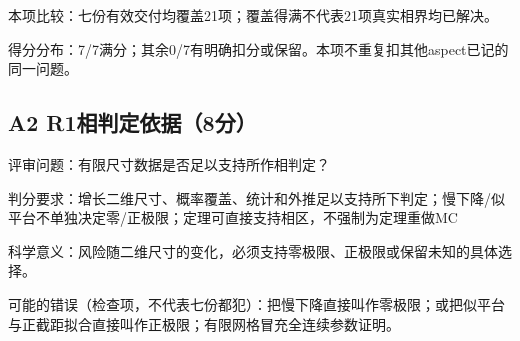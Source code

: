 \documentclass[11pt,a4paper]{article}
\begin{document}
本项比较：七份有效交付均覆盖21项；覆盖得满不代表21项真实相界均已解决。

得分分布：7/7满分；其余0/7有明确扣分或保留。本项不重复扣其他aspect已记的同一问题。

\clearpage
\subsection{A2 R1相判定依据（8分）}
\label{aspect:A2}
评审问题：有限尺寸数据是否足以支持所作相判定？

判分要求：增长二维尺寸、概率覆盖、统计和外推足以支持所下判定；慢下降/似平台不单独决定零/正极限；定理可直接支持相区，不强制为定理重做MC

科学意义：风险随二维尺寸的变化，必须支持零极限、正极限或保留未知的具体选择。

可能的错误（检查项，不代表七份都犯）：把慢下降直接叫作零极限；或把似平台与正截距拟合直接叫作正极限；有限网格冒充全连续参数证明。
\end{document}
